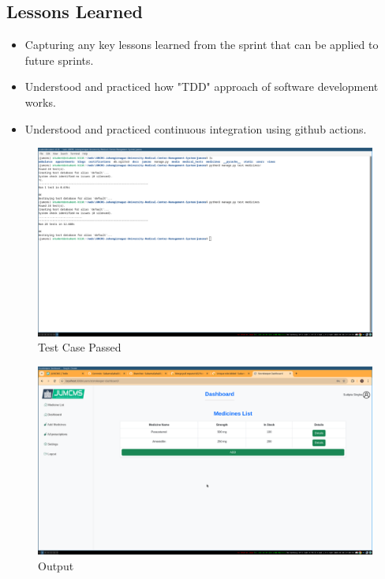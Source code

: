 \documentclass[a4paper,12pt]{article}
\begin{document}
\subsection{Lessons Learned}
\begin{itemize}
    \item Capturing any key lessons learned from the sprint that can be applied to future sprints.

    \item Understood and practiced how "TDD" approach of software development works.
    \item Understood and practiced continuous integration using github actions.
\end{itemize}
\begin{figure}[H]
    \centering
    \includegraphics[width=1\textwidth]{images/meet4test.png}
    \caption{Test Case Passed}
    \label{fig:testcase}
\end{figure}
\begin{figure}[H]
    \centering
    \includegraphics[width=1\textwidth]{images/output1.png}
    \caption{Output}
    \label{fig:output1}
\end{figure}
\end{document}

